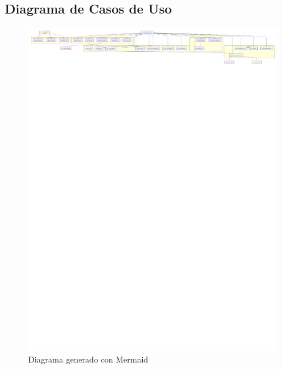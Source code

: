 \documentclass{pretexto/report}
\begin{document}
\subsection{Diagrama de Casos de Uso}
\begin{figure}[H]
    \centering
    \includegraphics[width=\linewidth]{pdfs/use_cases.pdf}
    \caption{Diagrama generado con Mermaid}
\end{figure}



\pagebreak
\printbibliography[heading=bibintoc]
\end{document}
